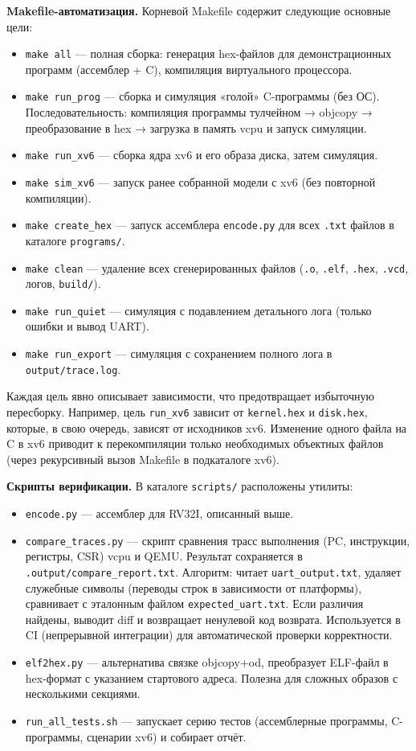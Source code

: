 \textbf{Makefile-автоматизация.} Корневой Makefile содержит следующие основные цели:
\begin{itemize}
  \item \texttt{make all} — полная сборка: генерация hex-файлов для демонстрационных программ (ассемблер + C), компиляция виртуального процессора.
  \item \texttt{make run\_prog} — сборка и симуляция «голой» C-программы (без ОС). Последовательность: компиляция программы тулчейном → objcopy → преобразование в hex → загрузка в память vcpu и запуск симуляции.
  \item \texttt{make run\_xv6} — сборка ядра xv6 и его образа диска, затем симуляция.
  \item \texttt{make sim\_xv6} — запуск ранее собранной модели с xv6 (без повторной компиляции).
  \item \texttt{make create\_hex} — запуск ассемблера \texttt{encode.py} для всех \texttt{.txt} файлов в каталоге \texttt{programs/}.
  \item \texttt{make clean} — удаление всех сгенерированных файлов (\texttt{.o}, \texttt{.elf}, \texttt{.hex}, \texttt{.vcd}, логов, \texttt{build/}).
  \item \texttt{make run\_quiet} — симуляция с подавлением детального лога (только ошибки и вывод UART).
  \item \texttt{make run\_export} — симуляция с сохранением полного лога в \texttt{output/trace.log}.
\end{itemize}
Каждая цель явно описывает зависимости, что предотвращает избыточную пересборку. Например, цель \texttt{run\_xv6} зависит от \texttt{kernel.hex} и \texttt{disk.hex}, которые, в свою очередь, зависят от исходников xv6. Изменение одного файла на C в xv6 приводит к перекомпиляции только необходимых объектных файлов (через рекурсивный вызов Makefile в подкаталоге xv6).

\textbf{Скрипты верификации.} В каталоге \texttt{scripts/} расположены утилиты:
\begin{itemize}
  \item \texttt{encode.py} — ассемблер для RV32I, описанный выше.
  \item \texttt{compare\_traces.py} — скрипт сравнения трасс выполнения (PC, инструкции, регистры, CSR) vcpu и QEMU. Результат сохраняется в \texttt{.output/compare\_report.txt}. Алгоритм: читает \texttt{uart\_output.txt}, удаляет служебные символы (переводы строк в зависимости от платформы), сравнивает с эталонным файлом \texttt{expected\_uart.txt}. Если различия найдены, выводит diff и возвращает ненулевой код возврата. Используется в CI (непрерывной интеграции) для автоматической проверки корректности.
  \item \texttt{elf2hex.py} — альтернатива связке objcopy+od, преобразует ELF-файл в hex-формат с указанием стартового адреса. Полезна для сложных образов с несколькими секциями.
  \item \texttt{run\_all\_tests.sh} — запускает серию тестов (ассемблерные программы, C-программы, сценарии xv6) и собирает отчёт.
\end{itemize}

